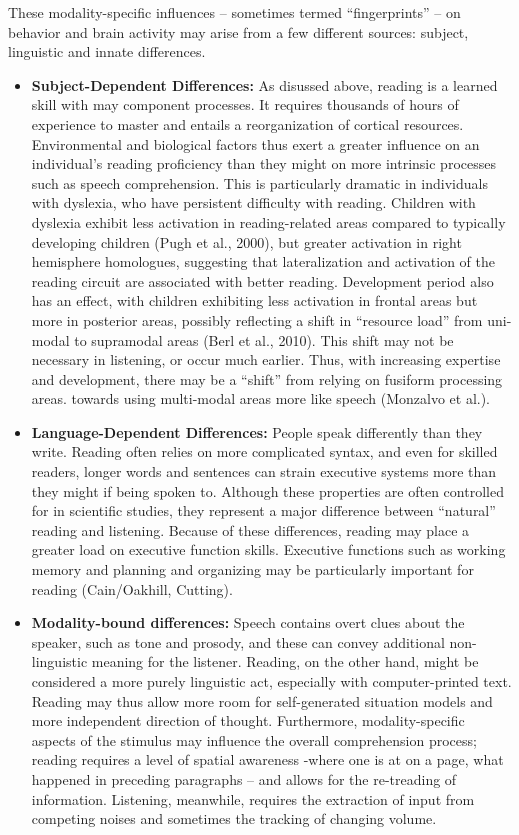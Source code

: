 These modality-specific influences – sometimes termed “fingerprints” – on behavior and brain activity may arise from a few different sources: subject, linguistic and innate differences. 

\begin{itemize}
	\item \textbf{Subject-Dependent Differences:} As disussed above, reading is a learned skill with may component processes. It requires thousands of hours of experience to master and entails a reorganization of cortical resources. Environmental and biological factors thus exert a greater influence on an individual’s reading proficiency than they might on more intrinsic processes such as speech comprehension. This is particularly dramatic in individuals with dyslexia, who have persistent difficulty with reading. Children with dyslexia exhibit less activation in reading-related areas compared to typically developing children (Pugh et al., 2000), but greater activation in right hemisphere homologues, suggesting that lateralization and activation of the reading circuit are associated with better reading. Development period also has an effect, with children exhibiting less activation in frontal areas but more in posterior areas, possibly reflecting a shift in “resource load” from uni-modal to supramodal areas (Berl et al., 2010). This shift may not be necessary in listening, or occur much earlier. Thus, with increasing expertise and development, there may be a “shift” from relying on fusiform processing areas. towards using multi-modal areas more like speech (Monzalvo et al.). 
	\item \textbf{Language-Dependent Differences:} People speak differently than they write. Reading often relies on more complicated syntax, and even for skilled readers, longer words and sentences can strain executive systems more than they might if being spoken to. Although these properties are often controlled for in scientific studies, they represent a major difference between “natural” reading and listening. Because of these differences, reading may place a greater load on executive function skills. Executive functions such as working memory and planning and organizing may be particularly important for reading (Cain/Oakhill, Cutting).  
	\item \textbf{Modality-bound differences:} Speech contains overt clues about the speaker, such as tone and prosody, and these can convey additional non-linguistic meaning for the listener. Reading, on the other hand, might be considered a more purely linguistic act, especially with computer-printed text. Reading may thus allow more room for self-generated situation models and more independent direction of thought. Furthermore, modality-specific aspects of the stimulus may influence the overall comprehension process; reading requires a level of spatial awareness -where one is at on a page, what happened in preceding paragraphs – and allows for the re-treading of information. Listening, meanwhile, requires the extraction of input from competing noises and sometimes the tracking of changing volume. 
\end{itemize}


